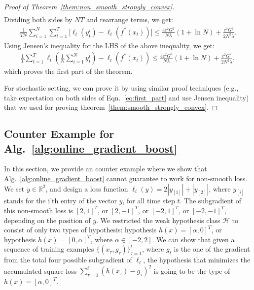 \begin{proof}[Proof of Theorem~\ref{them:non_smooth_strongly_convex}]
\begin{align}
\end{align}
Dividing both sides by $NT$ and rearrange terms, we get:
\begin{align}
\frac{1}{TN}\sum_{i=1}^N\sum_{t=1}^T\big[\ell_t(y_t^i) - \ell_t(f^*(x_t))\big] \leq \frac{4c^2G^2}{N\lambda}(1+\ln N) + \frac{c^2G^2}{2N^2\lambda}.  \nonumber
\end{align} Using Jensen's inequality for the LHS of the above inequality, we get:
\begin{align}
\label{eq:first_part}
\frac{1}{T}\sum_{t=1}^T\ell_t(\frac{1}{N}\sum_{i=1}^N y_t^i) - \ell_t(f^*(x_t)) \leq \frac{4c^2G^2}{N\lambda}(1+\ln N) + \frac{c^2G^2}{2N^2\lambda},  \nonumber
\end{align} which proves the first part of the theorem. 

For stochastic setting, we can prove it by using similar proof techniques (e.g., take expectation on both sides of Eqn.~\ref{eq:first_part} and use Jensen inequality) that we used for proving  theorem~\ref{them:smooth_strongly_convex}. 
\end{proof}

\subsection{Counter Example for
Alg.~\ref{alg:online_gradient_boost}}
\label{sec:counter_example}
In this section, we provide an counter example where we show that Alg.~\ref{alg:online_gradient_boost} cannot guarantee to work for non-smooth loss. We set $y\in\mathbb{R}^2$, and design a loss function $\ell_t(y) = 2|y_{[1]}|+|y_{[2]}|$, where $y_{[i]}$ stands for the i'th entry of the vector $y$, for all time step $t$. The subgradient of this non-smooth loss is $[2,1]^T$, or $[2,-1]^T$, or $[-2,1]^T$, or $[-2,-1]^T$, depending on the position of $y$. We restricted the weak hypothesis class $\mathcal{H}$ to consist of only two types of hypothesis: hypothesis $h(x) = [\alpha, 0]^T$, or hypothesis $h(x) = [0,\alpha]^T$, where $\alpha \in [-2,2]$. We can show that given a sequence of training examples $\{(x_{\tau}, g_{\tau})\}_{\tau=1}^t$, where $g_t$ is the one of the gradient from the total four possible subgradient of $\ell_t$, the hypothesis that minimizes the accumulated square loss $\sum_{\tau=1}^t (h(x_{\tau}) - g_{\tau})^2$ is going to be the type of $h(x) = [\alpha, 0]^T$.

